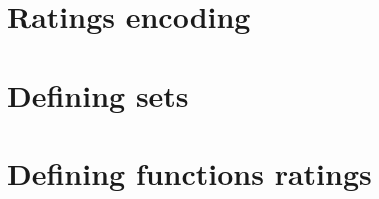 
\section*{Ratings encoding}

\vfill
\section*{Defining sets}

\vfill
\section*{Defining functions ratings}

\vfill

